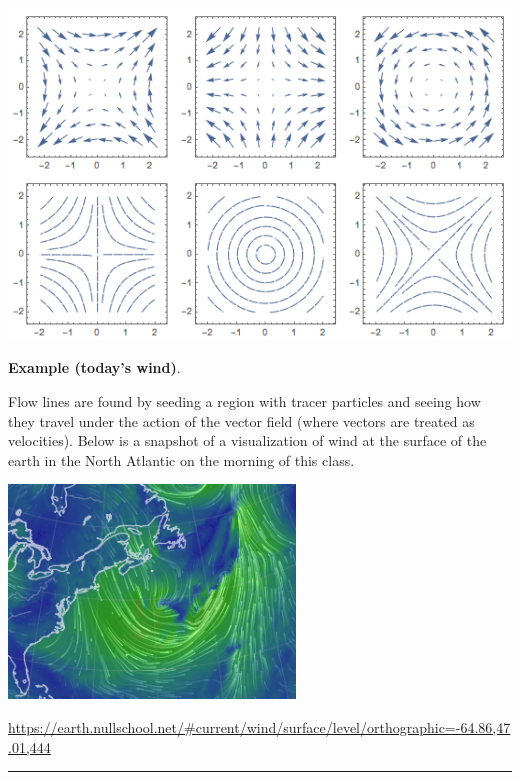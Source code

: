 \documentclass[12pt,letterpaper,noanswers]{exam}
\begin{document}
\includegraphics[width=0.9\linewidth]{img/C24p6-18.png}

\vfill





\noindent\textbf{Example (today's wind)}.

Flow lines are found by seeding a region with tracer particles and seeing how they travel under the action of the vector field (where vectors are treated as velocities).  Below is a snapshot of a visualization of wind at the surface of the earth in the North Atlantic on the morning of this class.


\includegraphics[width=3in]{img/C19-wind.png}

\url{https://earth.nullschool.net/#current/wind/surface/level/orthographic=-64.86,47.01,444}

\vspace{0.2cm}
\hrule
\vspace{0.2cm}





\end{document}
